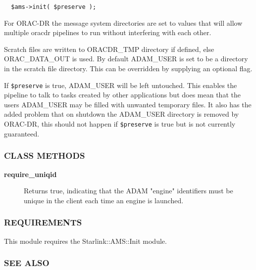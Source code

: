 \begin{description}
\begin{description}
\begin{description}
\begin{verbatim}
  $ams->init( $preserve );
\end{verbatim}


For ORAC-DR the message system directories are set to
values that will allow multiple oracdr pipelines to run
without interfering with each other.



Scratch files are written to ORACDR\_TMP directory if defined,
else ORAC\_DATA\_OUT is used. By default ADAM\_USER is set
to be a directory in the scratch file directory. This can be
overridden by supplying an optional flag.



If \texttt{\$preserve} is true, ADAM\_USER will be left untouched. This
enables the pipeline to talk to tasks created by other applications
but does mean that the users ADAM\_USER may be filled with unwanted
temporary files. It also has the added problem that on shutdown
the ADAM\_USER directory is removed by ORAC-DR, this should not happen
if \texttt{\$preserve} is true but is not currently guaranteed.

\end{description}
\subsubsection*{CLASS METHODS\label{ORAC::Msg::Control::AMS_CLASS_METHODS}}
\begin{description}

\item[{\textbf{require\_uniqid}}] \mbox{}

Returns true, indicating that the ADAM "engine" identifiers must
be unique in the client each time an engine is launched.

\end{description}
\subsubsection*{REQUIREMENTS\label{ORAC::Msg::Control::AMS_REQUIREMENTS}}


This module requires the Starlink::AMS::Init module.

\subsubsection*{SEE ALSO\label{ORAC::Msg::Control::AMS_SEE_ALSO}}



\end{description}
\end{description}
